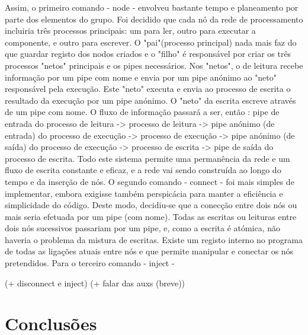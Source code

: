 \documentclass[a4paper]{article}
\begin{document}
Assim, o primeiro comando - node - envolveu bastante tempo e planeamento por parte dos elementos do grupo. Foi decidido que cada nó da rede de processamento incluiria três processos principais: um para ler, outro para executar a componente, e outro para escrever. O "pai"(processo principal) nada mais faz do que guardar registo dos nodos criados e o "filho" é responsável por criar os três processos "netos" principais e os pipes necessários. Nos "netos", o de leitura recebe informação por um pipe com nome e envia por um pipe anónimo ao "neto" responsável pela execução. Este "neto" executa e envia ao processo de escrita o resultado da execução por um pipe anónimo. O "neto" da escrita escreve através de um pipe com nome. O fluxo de informação passará a ser, então : pipe de entrada do processo de leitura -> processo de leitura -> pipe anónimo (de entrada) do processo de execução -> processo de execução -> pipe anónimo (de saída) do processo de execução -> processo de escrita -> pipe de saída do processo de escrita. Todo este sistema permite uma permanência da rede e um fluxo de escrita constante e eficaz, e a rede vai sendo construída ao longo do tempo e da inserção de nós.
O segundo comando - connect - foi mais simples de implementar, embora exigisse também perspicácia para manter a eficiência e simplicidade do código. Deste modo, decidiu-se que a conecção entre dois nós ou mais seria efetuada por um pipe (com nome). Todas as escritas ou leituras entre dois nós sucessivos passariam por um pipe, e, como a escrita é atómica, não haveria o problema da mistura de escritas. Existe um registo interno no programa de todas as ligações atuais entre nós e que permite manipular e conectar os nós pretendidos.
Para o terceiro comando - inject - 

(+ disconnect e inject)
(+ falar das auxs (breve))

\section{Conclusões}
\label{sec:6}
\end{document}
